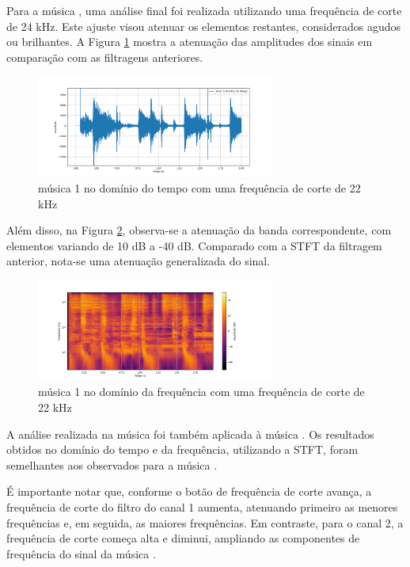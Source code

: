 Para a música \cite{track01}, uma análise final foi realizada utilizando uma frequência de corte de 24 kHz. Este ajuste visou atenuar os elementos restantes, considerados agudos ou brilhantes. A Figura \ref{fig30} mostra a atenuação das amplitudes dos sinais em comparação com as filtragens anteriores.

\begin{figure}[h]
    \centering
    \includegraphics[width=0.7\textwidth]{figuras/fig30.png}
    \caption{música 1 no domínio do tempo com uma frequência de corte de 22 kHz}
    \label{fig30}
\end{figure}

Além disso, na Figura \ref{fig31}, observa-se a atenuação da banda correspondente, com elementos variando de 10 dB a -40 dB. Comparado com a STFT da filtragem anterior, nota-se uma atenuação generalizada do sinal.

\begin{figure}[h]
    \centering
    \includegraphics[width=0.7\textwidth]{figuras/fig31.png}
    \caption{música 1 no domínio da frequência com uma frequência de corte de 22 kHz}
    \label{fig31}
\end{figure}

A análise realizada na música \cite{track01} foi também aplicada à música \cite{track02}. Os resultados obtidos no domínio do tempo e da frequência, utilizando a STFT, foram semelhantes aos observados para a música \cite{track01}.

É importante notar que, conforme o botão de frequência de corte avança, a frequência de corte do filtro do canal 1 aumenta, atenuando primeiro as menores frequências e, em seguida, as maiores frequências. Em contraste, para o canal 2, a frequência de corte começa alta e diminui, ampliando as componentes de frequência do sinal da música \cite{track02}.

